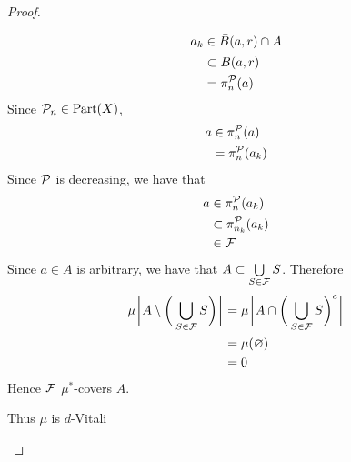 \documentclass{book}
\begin{document}
\begin{proof}
\begin{itemize}
\begin{enumerate}
				\begin{align*}
					a_k 
					& \in \bar{B}(a, r) \cap A \\
					& \subset \bar{B}(a, r) \\
					& = \pi^{\mathcal{P}}_n(a)
				\end{align*}
				Since $\mathcal{P}_n \in \text{Part}(X)$, 
				\begin{align*}
					a
					& \in \pi^{\mathcal{P}}_n(a) \\
					& = \pi^{\mathcal{P}}_n(a_k) \\
				\end{align*}
				Since $\mathcal{P}$ is decreasing, we have that 
				\begin{align*}
					a
					& \in \pi^{\mathcal{P}}_n(a_k) \\
					& \subset \pi^{\mathcal{P}}_{n_k}(a_k) \\
					& \in \mathcal{F} 
				\end{align*}
				Since $a \in A$ is arbitrary, we have that $A \subset \bigcup\limits_{S \in \mathcal{F}}S$. Therefore 
				\begin{align*}
					\mu \bigg[ A \setminus \bigg(\bigcup_{S \in \mathcal{F}}S \bigg) \bigg] 
					& = \mu \bigg[ A \cap \bigg(\bigcup_{S \in \mathcal{F}}S \bigg)^c \bigg] \\ 
					& = \mu(\varnothing) \\
					& = 0
				\end{align*}
				Hence $\mathcal{F}$ $\mu^*$-covers $A$. 
			\end{enumerate}
			Thus $\mu$ is $d$-Vitali
		\end{itemize}
	\end{proof}
	
	
	
	
	
	
	
	
	
	
	
	
	
	
	
	
	
	
	
	
	
	
	
	
	
	
	
	
	
	
	
	
	
	
	
	
	
	
	
	
	
	
	
\end{document}
